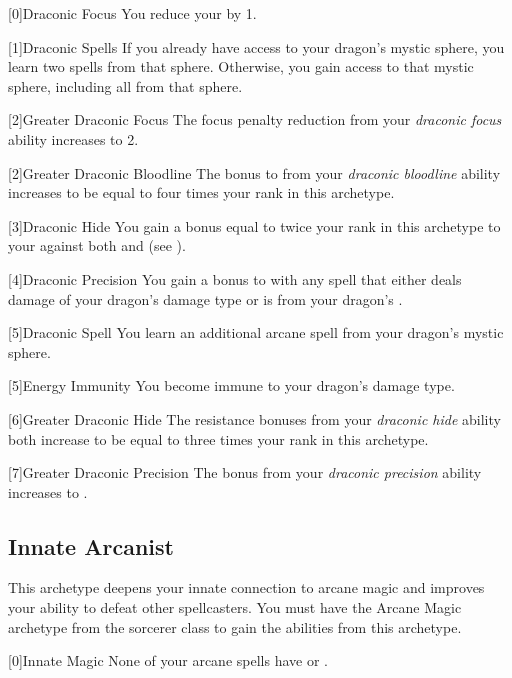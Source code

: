         [0]{Draconic Focus} You reduce your  by 1.

        [1]{Draconic Spells} If you already have access to your dragon's mystic sphere, you learn two spells from that sphere.
        Otherwise, you gain access to that mystic sphere, including all  from that sphere.

        [2]{Greater Draconic Focus} The focus penalty reduction from your \textit{draconic focus} ability increases to 2.

        [2]{Greater Draconic Bloodline} The bonus to  from your \textit{draconic bloodline} ability increases to be equal to four times your rank in this archetype.

        [3]{Draconic Hide} You gain a bonus equal to twice your rank in this archetype to your  against both  and  (see ).

        [4]{Draconic Precision} You gain a  bonus to  with any spell that either deals damage of your dragon's damage type or is from your dragon's .

        [5]{Draconic Spell} You learn an additional arcane spell from your dragon's mystic sphere.

        [5]{Energy Immunity} You become immune to your dragon's damage type.

        [6]{Greater Draconic Hide} The resistance bonuses from your \textit{draconic hide} ability both increase to be equal to three times your rank in this archetype.

        [7]{Greater Draconic Precision} The bonus from your \textit{draconic precision} ability increases to .

    \newpage
    \subsection{Innate Arcanist}
        This archetype deepens your innate connection to arcane magic and improves your ability to defeat other spellcasters.
        You must have the Arcane Magic archetype from the sorcerer class to gain the abilities from this archetype.

        [0]{Innate Magic} None of your arcane spells have  or .

